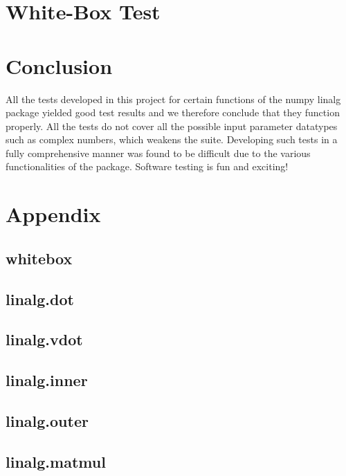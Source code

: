 \documentclass[a4paper,11pt]{article}
\begin{document}
\section{White-Box Test}



\section{Conclusion}
All the tests developed in this project for certain functions of the numpy linalg package yielded good test results and we therefore conclude that they function properly. All the tests do not cover all the possible input parameter datatypes such as complex numbers, which weakens the suite. Developing such tests in a fully comprehensive manner was found to be difficult due to the various functionalities of the package. Software testing is fun and exciting!

\section{Appendix}

\subsection{whitebox}




\subsection{linalg.dot}


\subsection{linalg.vdot}


\subsection{linalg.inner}


\subsection{linalg.outer}


\subsection{linalg.matmul}

\end{document}
